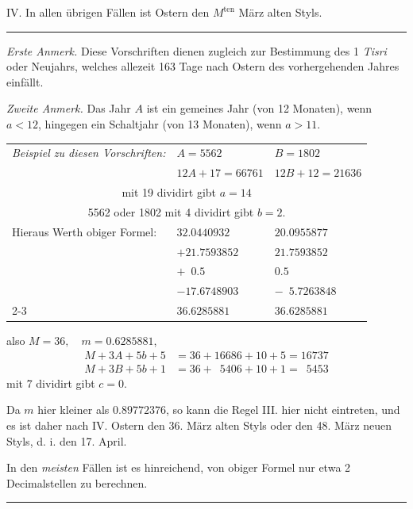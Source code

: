 IV. In allen übrigen Fällen ist Ostern den $M^{\mathrm{ten}}$ März alten Styls.

\begin{center}\rule{.25\linewidth}{.3pt}\end{center}

\textit{Erste Anmerk.} Diese Vorschriften dienen zugleich zur Bestimmung des
1 \textit{Tisri} oder Neujahrs, welches allezeit 163 Tage nach Ostern des vorhergehenden
Jahres einfällt.

\textit{Zweite Anmerk.} Das Jahr $A$ ist ein gemeines Jahr (von 12 Monaten), wenn
$a<12$, hingegen ein Schaltjahr (von 13 Monaten), wenn $a>11$.

\begin{center}\small
\begin{tabular}{lll}
\textit{Beispiel zu diesen Vorschriften:} & $A=5562$ & $B=1802$\\
& $12A+17=66761$ & $12B+12=21636$\\
\multicolumn{3}{c}{mit 19 dividirt gibt $a=14$}\\
\multicolumn{3}{c}{5562 oder 1802 mit 4 dividirt gibt $b=2$.}\\
Hieraus Werth obiger Formel: & $32.0440932$ & $20.0955877$\\
& $+21.7593852$ & $21.7593852$\\
& $+\phantom{0}0.5$ & $0.5$\\
& $-17.6748903$ & $-\phantom{0}5.7263848$\\\cline{2-3}
& $36.6285881$ & $36.6285881$
\end{tabular}
\end{center}
also $M=36,\quad m=0.6285881$,
\[
\begin{aligned}
M+3A+5b+5&=36+16686+10+5=16737\\
M+3B+5b+1&=36+\phantom{0}5406+10+1=\phantom{0}5453
\end{aligned}
\]
mit 7 dividirt gibt $c=0$.

Da $m$ hier kleiner als $0.89772376$, so kann die Regel III. hier nicht eintreten,
und es ist daher nach IV. Ostern den 36. März alten Styls oder den
48. März neuen Styls, d. i. den 17. April.

In den \textit{meisten} Fällen ist es hinreichend, von obiger Formel nur etwa 2
Decimalstellen zu berechnen.

\begin{center}\rule{.25\linewidth}{.3pt}\end{center}
